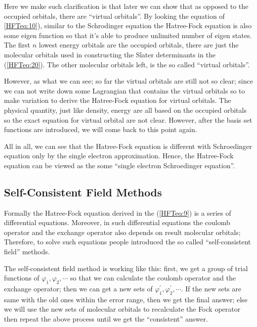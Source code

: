 Here we make such clarification is that later we can show that as opposed to
the occupied orbitals, there are ``virtual orbitals''. By looking the equation
of \ref{HFTeq:10}), similar to the Schrodinger equation the Hatree-Fock
equation is also some eigen function so that it's able to produce
unlimited number of eigen states. The first $n$ lowest energy orbitals are the
occupied orbitals, there are just the molecular orbitals used in constructing
the Slater determinants in the (\ref{HFTeq:20}). The other molecular orbitals
left, is the so called ``virtual orbitals''.

However, as what we can see; so far the virtual orbitals are still not so
clear; since we can not write down some Lagrangian that contains the virtual
orbitals so to make variation to derive the Hatree-Fock equation for virtual
orbitals. The physical quantity, just like density, energy are all based on the
occupied orbitals so the exact equation for virtual orbital are not clear.
However, after the basis set functions are introduced, we will come back to
this point again.

All in all, we can see that the Hatree-Fock equation is different
with Schroedinger equation only by the single electron approximation.
Hence, the Hatree-Fock equation can be viewed as the some ``single
electron Schroedinger equation''.

\subsection{Self-Consistent Field Methods}
%
%
%


Formally the Hatree-Fock equation derived in the (\ref{HFTeq:9}) is
a series of differential equations. Moreover, in such differential
equations the coulomb operator and the exchange operator also
depends on result molecular orbitals; Therefore, to solve such
equations people introduced the so called ``self-consistent field''
methods.

The self-consistent field method is working like this: first, we get
a group of trial functions of $\varphi_{1}, \varphi_{2}, \cdots$ so
that we can calculate the coulomb operator and the exchange
operator; then we can get a new sets of $\varphi^{'}_{1},
\varphi^{'}_{2}, \cdots$. If the new sets are same with the old ones
within the error range, then we get the final answer; else we will
use the new sets of molecular orbitals to recalculate the Fock
operator then repeat the above process until we get the
``consistent'' answer.


